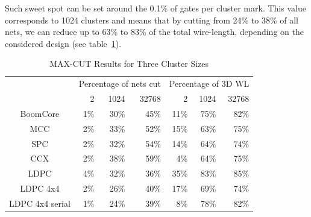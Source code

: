 \documentclass[conference]{IEEEtran}
\begin{document}
Such sweet spot can be set around the 0.1\% of gates per cluster mark.
This value corresponds to 1024 clusters and means that by cutting from 24\% to 38\% of all nets, we can reduce up to 63\% to 83\% of the total wire-length, depending on the considered design (see table~\ref{tab:res}).

\begin{table}[!t]
\renewcommand{\arraystretch}{1.3}
\caption{MAX-CUT Results for Three Cluster Sizes}
\label{tab:res}
\centering
\begin{tabular}{||c||r|r|r||r|r|r||}
\cline{2-7}
\multicolumn{1}{c||}{} & \multicolumn{3}{c||}{Percentage of nets cut} & \multicolumn{3}{c||}{Percentage of 3D WL}\\
\cline{2-7}
\multicolumn{1}{c||}{} & 2 & 1024 & 32768 & 2 & 1024 & 32768\\
\cline{2-7}
\hline
BoomCore & 1\% & 30\% & 45\% & 11\% & 75\% & 82\%\\
\hline
MCC & 2\% & 33\% & 52\% & 15\% & 63\% & 75\%\\
\hline
SPC & 2\% & 32\% & 54\% & 14\% & 64\% & 74\%\\
\hline
CCX & 2\% & 38\% & 59\% & 4\% & 64\% & 75\%\\
\hline
LDPC & 4\% & 32\% & 36\% & 35\% & 83\% & 85\%\\
\hline
LDPC 4x4 & 2\% & 26\% & 40\% & 17\% & 69\% & 74\%\\
\hline
LDPC 4x4 serial & 1\% & 24\% & 39\% & 8\% & 78\% & 82\%\\
\hline
\end{tabular}
\end{table}


\end{document}
